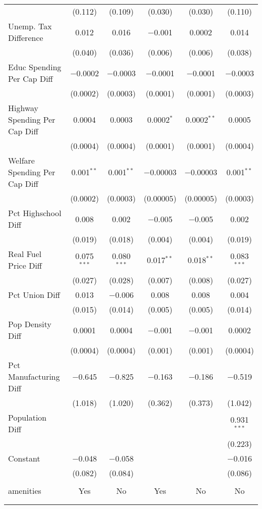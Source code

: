 \begin{table}[!htbp]
\begin{tabular}{@{\extracolsep{5pt}}lccccc}
  & (0.112) & (0.109) & (0.030) & (0.030) & (0.110) \\ 
  Unemp. Tax Difference & 0.012 & 0.016 & $-$0.001 & 0.0002 & 0.014 \\ 
  & (0.040) & (0.036) & (0.006) & (0.006) & (0.038) \\ 
  Educ Spending Per Cap Diff & $-$0.0002 & $-$0.0003 & $-$0.0001 & $-$0.0001 & $-$0.0003 \\ 
  & (0.0002) & (0.0003) & (0.0001) & (0.0001) & (0.0003) \\ 
  Highway Spending Per Cap Diff & 0.0004 & 0.0003 & 0.0002$^{*}$ & 0.0002$^{**}$ & 0.0005 \\ 
  & (0.0004) & (0.0004) & (0.0001) & (0.0001) & (0.0004) \\ 
  Welfare Spending Per Cap Diff & 0.001$^{**}$ & 0.001$^{**}$ & $-$0.00003 & $-$0.00003 & 0.001$^{**}$ \\ 
  & (0.0002) & (0.0003) & (0.00005) & (0.00005) & (0.0003) \\ 
  Pct Highschool Diff & 0.008 & 0.002 & $-$0.005 & $-$0.005 & 0.002 \\ 
  & (0.019) & (0.018) & (0.004) & (0.004) & (0.019) \\ 
  Real Fuel Price Diff & 0.075$^{***}$ & 0.080$^{***}$ & 0.017$^{**}$ & 0.018$^{**}$ & 0.083$^{***}$ \\ 
  & (0.027) & (0.028) & (0.007) & (0.008) & (0.027) \\ 
  Pct Union Diff & 0.013 & $-$0.006 & 0.008 & 0.008 & 0.004 \\ 
  & (0.015) & (0.014) & (0.005) & (0.005) & (0.014) \\ 
  Pop Density Diff & 0.0001 & 0.0004 & $-$0.001 & $-$0.001 & 0.0002 \\ 
  & (0.0004) & (0.0004) & (0.001) & (0.001) & (0.0004) \\ 
  Pct Manufacturing Diff & $-$0.645 & $-$0.825 & $-$0.163 & $-$0.186 & $-$0.519 \\ 
  & (1.018) & (1.020) & (0.362) & (0.373) & (1.042) \\ 
  Population Diff &  &  &  &  & 0.931$^{***}$ \\ 
  &  &  &  &  & (0.223) \\ 
  Constant & $-$0.048 & $-$0.058 &  &  & $-$0.016 \\ 
  & (0.082) & (0.084) &  &  & (0.086) \\ 
 \hline \\[-1.8ex] 
amenities & Yes & No & Yes & No & No \\ 
\hline \\[-1.8ex] 
\hline 
\hline \\[-1.8ex] 
\end{tabular} 
\end{table} 
